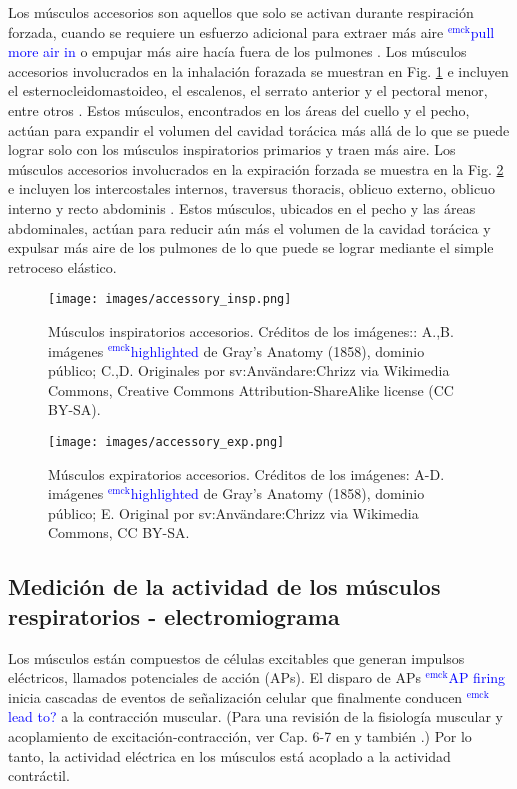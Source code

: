 \documentclass[12pt]{article}
\newcommand{\emck}[1]{\textcolor{blue}{$^{\textrm{emck}}${#1}}}
\begin{document}
Los músculos accesorios son aquellos que solo se activan durante
respiración forzada, cuando se requiere un esfuerzo adicional para
extraer más aire \emck{pull more air in} o empujar más aire hacía
fuera de los pulmones \cite{openStax2016resp,sieck2013mechanical}. Los
músculos accesorios involucrados en la inhalación forazada se muestran
en Fig. \ref{fig:acc_insp} e incluyen el esternocleidomastoideo, el
escalenos, el serrato anterior y el pectoral menor, entre otros
\cite{troyer1986action,ratnovsky2008mechanics}. Estos músculos,
encontrados en los áreas del cuello y el pecho, actúan para expandir
el volumen del cavidad torácica más allá de lo que se puede lograr
solo con los músculos inspiratorios primarios y traen más aire. Los
músculos accesorios involucrados en la expiración forzada se muestra
en la Fig. \ref{fig:acc_exp} e incluyen los intercostales internos,
traversus thoracis, oblicuo externo, oblicuo interno y recto abdominis
\cite{troyer1986action,ratnovsky2008mechanics}. Estos músculos,
ubicados en el pecho y las áreas abdominales, actúan para reducir aún
más el volumen de la cavidad torácica y expulsar más aire de los
pulmones de lo que puede se lograr mediante el simple retroceso
elástico.

\begin{figure}[h!]
\centering
\texttt{[image: images/accessory\_insp.png]}
\caption{Músculos inspiratorios accesorios. Créditos de los imágenes::
  A.,B. imágenes \emck{highlighted} de Gray's Anatomy (1858), dominio
  público; C.,D. Originales por sv:Anv\"andare:Chrizz via Wikimedia
  Commons, Creative Commons Attribution-ShareAlike license (CC
  BY-SA).}
\label{fig:acc_insp}
\end{figure}%

\begin{figure}[h!]
\centering
\texttt{[image: images/accessory\_exp.png]}
\caption{Músculos expiratorios accesorios. Créditos de los imágenes:
  A-D. imágenes \emck{highlighted} de Gray's Anatomy (1858), dominio
  público; E. Original por sv:Anv\"andare:Chrizz via Wikimedia Commons,
  CC BY-SA.}
\label{fig:acc_exp}
\end{figure}

\subsection*{Medición de la actividad de los músculos respiratorios - electromiograma}

Los músculos están compuestos de células excitables que generan
impulsos eléctricos, llamados potenciales de acción (APs). El disparo
de APs \emck{AP firing} inicia cascadas de eventos de señalización
celular que finalmente conducen \emck{lead to?} a la contracción
muscular. (Para una revisión de la fisiología muscular y acoplamiento
de excitación-contracción, ver Cap. 6-7 en \cite{guyton20006textbook}
y también \cite{sieck2013mechanical}.) Por lo tanto, la actividad
eléctrica en los músculos está acoplado a la actividad contráctil.
\end{document}
